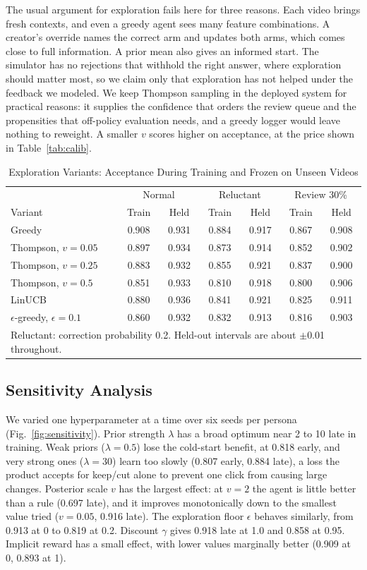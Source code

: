 \documentclass{ieeeaccess}
\begin{document}
The usual argument for exploration fails here for three reasons. Each video brings fresh contexts, and even a greedy agent sees many feature combinations. A creator's override names the correct arm and updates both arms, which comes close to full information. A prior mean also gives an informed start. The simulator has no rejections that withhold the right answer, where exploration should matter most, so we claim only that exploration has not helped under the feedback we modeled. We keep Thompson sampling in the deployed system for practical reasons: it supplies the confidence that orders the review queue and the propensities that off-policy evaluation needs, and a greedy logger would leave nothing to reweight. A smaller $v$ scores higher on acceptance, at the price shown in Table~\ref{tab:calib}.

\begin{table}[t]
\caption{Exploration Variants: Acceptance During Training and Frozen on Unseen Videos}
\label{tab:explore}
\setlength{\tabcolsep}{2.2pt}
\centering
\begin{tabular}{|l|cc|cc|cc|}
\hline
 & \multicolumn{2}{c|}{Normal} & \multicolumn{2}{c|}{Reluctant} & \multicolumn{2}{c|}{Review 30\%} \\
Variant & Train & Held & Train & Held & Train & Held \\
\hline
Greedy & 0.908 & 0.931 & 0.884 & 0.917 & 0.867 & 0.908 \\
Thompson, $v=0.05$ & 0.897 & 0.934 & 0.873 & 0.914 & 0.852 & 0.902 \\
Thompson, $v=0.25$ & 0.883 & 0.932 & 0.855 & 0.921 & 0.837 & 0.900 \\
Thompson, $v=0.5$ & 0.851 & 0.933 & 0.810 & 0.918 & 0.800 & 0.906 \\
LinUCB & 0.880 & 0.936 & 0.841 & 0.921 & 0.825 & 0.911 \\
$\epsilon$-greedy, $\epsilon=0.1$ & 0.860 & 0.932 & 0.832 & 0.913 & 0.816 & 0.903 \\
\hline
\multicolumn{7}{p{80mm}}{Reluctant: correction probability 0.2. Held-out intervals are about $\pm$0.01 throughout.}
\end{tabular}
\end{table}

\subsection{Sensitivity Analysis}
We varied one hyperparameter at a time over six seeds per persona (Fig.~\ref{fig:sensitivity}). Prior strength $\lambda$ has a broad optimum near 2 to 10 late in training. Weak priors ($\lambda=0.5$) lose the cold-start benefit, at 0.818 early, and very strong ones ($\lambda=30$) learn too slowly (0.807 early, 0.884 late), a loss the product accepts for keep/cut alone to prevent one click from causing large changes. Posterior scale $v$ has the largest effect: at $v=2$ the agent is little better than a rule (0.697 late), and it improves monotonically down to the smallest value tried ($v=0.05$, 0.916 late). The exploration floor $\epsilon$ behaves similarly, from 0.913 at 0 to 0.819 at 0.2. Discount $\gamma$ gives 0.918 late at 1.0 and 0.858 at 0.95. Implicit reward has a small effect, with lower values marginally better (0.909 at 0, 0.893 at 1).
\end{document}
